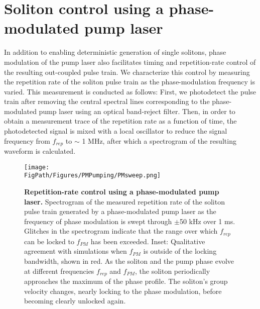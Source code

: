 \section{Soliton control using a phase-modulated pump laser}

In addition to enabling deterministic generation of single solitons, phase modulation of the pump laser also facilitates timing and repetition-rate control of the resulting out-coupled pulse train. We characterize this control by measuring the repetition rate of the soliton pulse train as the phase-modulation frequency is varied. This measurement is conducted as follows: First, we photodetect the pulse train after removing the central spectral lines corresponding to the phase-modulated pump laser using an optical band-reject filter. Then, in order to obtain a measurement trace of the repetition rate as a function of time, the photodetected signal is mixed with a local oscillator to reduce the signal frequency from $f_{rep}$ to $\sim$ 1 MHz, after which a spectrogram of the resulting waveform is calculated.

\begin{figure}[htpb]
	\begin{center}
		\texttt{[image: \\FigPath/Figures/PMPumping/PMsweep.png]}
	\end{center}
	\caption[Repetition-rate control using a phase-modulated pump laser]{\textbf{Repetition-rate control using a phase-modulated pump laser.} Spectrogram of the measured repetition rate of the soliton pulse train generated by a phase-modulated pump laser as the frequency of phase modulation is swept through $\pm$50 kHz over 1 ms. Glitches in the spectrogram indicate that the range over which $f_{rep}$ can be locked to $f_{PM}$ has been exceeded. Inset: Qualitative agreement with simulations when $f_{PM}$ is outside of the locking bandwidth, shown in red. As the soliton and the pump phase evolve at different frequencies $f_{rep}$ and $f_{PM}$, the soliton periodically approaches the maximum of the phase profile. The soliton's group velocity changes, nearly locking to the phase modulation, before becoming clearly unlocked again.}
	\label{fig:PMsweep}
\end{figure} 

